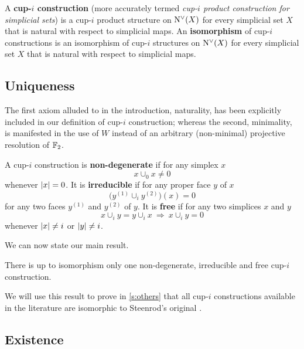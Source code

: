 \begin{definition}
	A \textbf{\mbox{cup-$i$} construction} (more accurately termed \emph{\mbox{cup-$i$} product construction for simplicial sets}) is a \mbox{cup-$i$} product structure on $\operatorname{N^{\vee}}(X)$ for every simplicial set $X$ that is natural with respect to simplicial maps.
	An \textbf{isomorphism} of \mbox{cup-$i$} constructions is an isomorphism of \mbox{cup-$i$} structures on $\operatorname{N^{\vee}}(X)$ for every simplicial set $X$ that is natural with respect to simplicial maps.
\end{definition}

\subsection{Uniqueness}

The first axiom alluded to in the introduction, naturality, has been explicitly included in our definition of \mbox{cup-$i$} construction; whereas the second, minimality, is manifested in the use of $W$ instead of an arbitrary (non-minimal) projective resolution of ${\mathbb{F}_2}$.

\begin{definition} \label{d:properties}
	A \mbox{cup-$i$} construction is \textbf{non-degenerate} if for any simplex $x$
	\[
	\boxed{x \cup_0 x \neq 0}
	\]
	whenever $\lvert x\rvert = 0$.
	It is \textbf{irreducible} if for any proper face $y$ of $x$
	\[
	\boxed{\Big( y^{(1)} \cup_{i} y^{(2)} \Big)(x) = 0}
	\]
	for any two faces $y^{(1)}$ and $y^{(2)}$ of $y$.
	It is \textbf{free} if for any two simplices $x$ and $y$
	\[
	\boxed{x \cup_{i} y = y \cup_{i} x} \
	\Longrightarrow \
	\boxed{x \cup_{i} y = 0}
	\]
	whenever $\lvert x\rvert \neq i$ or $\lvert y\rvert \neq i$.
\end{definition}

We can now state our main result.

\begin{theorem} \label{t:main}
	There is up to isomorphism only one non-degenerate, irreducible and free \mbox{cup-$i$} construction.
\end{theorem}

We will use this result to prove in \cref{s:others} that all \mbox{cup-$i$} constructions available in the literature are isomorphic to Steenrod's original \cite{steenrod1947products}.

\subsection{Existence}

